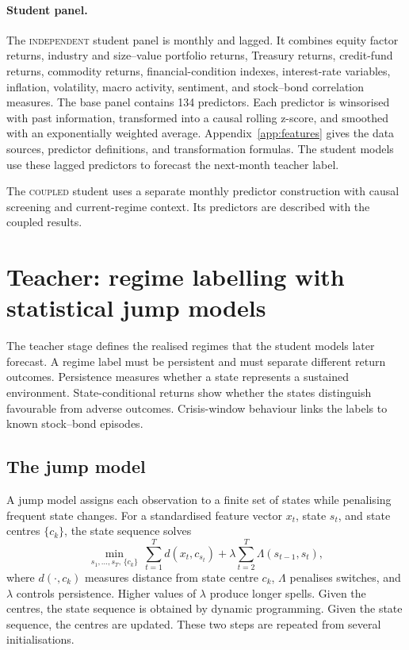 \documentclass[10pt]{article}
\newcommand{\Acoup}{\textsc{coupled}}
\newcommand{\Bindep}{\textsc{independent}}
\begin{document}
\paragraph{Student panel.}
The \Bindep{} student panel is monthly and lagged. It combines equity factor returns, industry and size--value portfolio returns, Treasury returns, credit-fund returns, commodity returns, financial-condition indexes, interest-rate variables, inflation, volatility, macro activity, sentiment, and stock--bond correlation measures. The base panel contains 134 predictors. Each predictor is winsorised with past information, transformed into a causal rolling z-score, and smoothed with an exponentially weighted average. Appendix~\ref{app:features} gives the data sources, predictor definitions, and transformation formulas. The student models use these lagged predictors to forecast the next-month teacher label.

The \Acoup{} student uses a separate monthly predictor construction with causal screening and current-regime context. Its predictors are described with the coupled results.

\section{Teacher: regime labelling with statistical jump models}
\label{sec:teacher}

The teacher stage defines the realised regimes that the student models later forecast. A regime label must be persistent and must separate different return outcomes. Persistence measures whether a state represents a sustained environment. State-conditional returns show whether the states distinguish favourable from adverse outcomes. Crisis-window behaviour links the labels to known stock--bond episodes.


\subsection{The jump model}

A jump model assigns each observation to a finite set of states while penalising frequent state changes. For a standardised feature vector \(x_t\), state \(s_t\), and state centres \(\{c_k\}\), the state sequence solves
\begin{equation}
    \min_{s_1,\dots,s_T,\,\{c_k\}}\
    \sum_{t=1}^{T} d(x_t,c_{s_t})
    +
    \lambda\sum_{t=2}^{T}\Lambda(s_{t-1},s_t),
    \label{eq:jump-generic}
\end{equation}
where \(d(\cdot,c_k)\) measures distance from state centre \(c_k\), \(\Lambda\) penalises switches, and \(\lambda\) controls persistence. Higher values of \(\lambda\) produce longer spells. Given the centres, the state sequence is obtained by dynamic programming. Given the state sequence, the centres are updated. These two steps are repeated from several initialisations.
\end{document}

